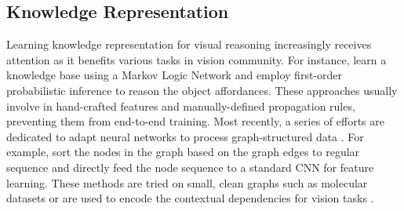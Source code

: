 \documentclass{article}
\begin{document}




\subsection{Knowledge Representation}
Learning knowledge representation for visual reasoning increasingly receives attention as it benefits various tasks \cite{malisiewicz2009beyond,lao2011random,zhu2014reasoning,lin2017knowledge} in vision community. For instance, \cite{zhu2014reasoning} learn a knowledge base using a Markov Logic Network and employ first-order probabilistic inference to reason the object affordances. These approaches usually involve in hand-crafted features and manually-defined propagation rules, preventing them from end-to-end training. Most recently, a series of efforts are dedicated to adapt neural networks to process graph-structured data \cite{duvenaud2015convolutional,niepert2016learning}. For example, \cite{niepert2016learning} sort the nodes in the graph based on the graph edges to regular sequence and directly feed the node sequence to a standard CNN for feature learning. These methods are tried on small, clean graphs such as molecular datasets \cite{duvenaud2015convolutional} or are used to encode the contextual dependencies for vision tasks \cite{liang2016semantic}.
\end{document}
